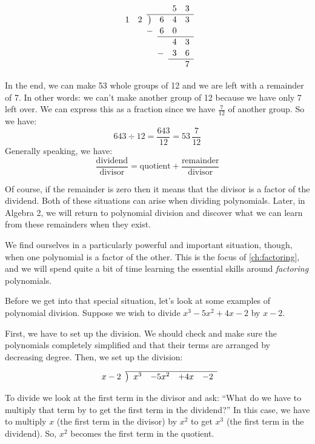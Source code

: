 \[
\renewcommand\arraystretch{1.1}
\begin{array}{*2r @{\hskip\arraycolsep}c@{\hskip\arraycolsep} *3r}
		&&&		~&5&3\\
\cline{3-6}
1&2		&\big)&		6&4&3\\
		&&-&		6&0&~\\
\cline{4-6}
		&&&		~&4&3\\
		&&&		-&3&6\\
\cline{5-6}
		&&&		~&~&7\\
\end{array}
\]

In the end, we can make 53 whole groups of 12 and we are left with a remainder of 7. In other words: we can't make another group of 12 because we have only 7 left over. We can express this as a fraction since we have $\frac{7}{12}$ of another group. So we have:
\[643 \div 12 = \frac{643}{12} = 53\,\frac{7}{12}\]
Generally speaking, we have:
\[\frac{\text{dividend}}{\text{divisor}} = \text{quotient}+\frac{\text{remainder}}{\text{divisor}}\]

Of course, if the remainder is zero then it means that the divisor is a factor of the dividend. Both of these situations can arise when dividing polynomials. Later, in Algebra 2, we will return to polynomial division and discover what we can learn from these remainders when they exist.

We find ourselves in a particularly powerful and important situation, though, when one polynomial is a factor of the other. This is the focus of \cref{ch:factoring}, and we will spend quite a bit of time learning the essential skills around \textit{factoring} polynomials.

Before we get into that special situation, let's look at some examples of polynomial division. Suppose we wish to divide $x^3-5x^2+4x-2$ by $x-2$.

First, we have to set up the division. We should check and make sure the polynomials completely simplified and that their terms are arranged by decreasing degree. Then, we set up the division:

\[
\renewcommand\arraystretch{1.1}
\begin{array}{*1r @{\hskip\arraycolsep}c@{\hskip\arraycolsep} *4r}
\cline{2-6}
x-2		&\big)	&x^3&-5x^2&+4x&-2\\
\end{array}
\]

To divide we look at the first term in the divisor and ask: ``What do we have to multiply that term by to get the first term in the dividend?'' In this case, we have to multiply $x$ (the first term in the divisor) by $x^2$ to get $x^3$ (the first term in the dividend). So, $x^2$ becomes the first term in the quotient.

